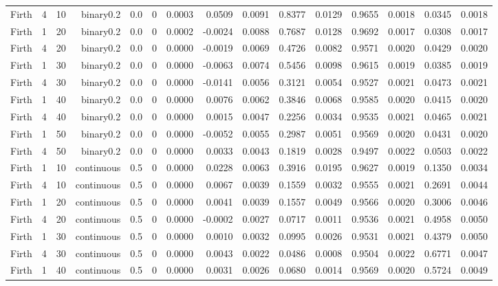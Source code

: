 \begin{longtable}{rrrrrrrrrrrrrrr}
  Firth & 4 & 10 & binary0.2 & 0.0 & 0 & 0.0003 & 0.0509 & 0.0091 & 0.8377 & 0.0129 & 0.9655 & 0.0018 & 0.0345 & 0.0018 \\ 
  Firth & 1 & 20 & binary0.2 & 0.0 & 0 & 0.0002 & -0.0024 & 0.0088 & 0.7687 & 0.0128 & 0.9692 & 0.0017 & 0.0308 & 0.0017 \\ 
  Firth & 4 & 20 & binary0.2 & 0.0 & 0 & 0.0000 & -0.0019 & 0.0069 & 0.4726 & 0.0082 & 0.9571 & 0.0020 & 0.0429 & 0.0020 \\ 
  Firth & 1 & 30 & binary0.2 & 0.0 & 0 & 0.0000 & -0.0063 & 0.0074 & 0.5456 & 0.0098 & 0.9615 & 0.0019 & 0.0385 & 0.0019 \\ 
  Firth & 4 & 30 & binary0.2 & 0.0 & 0 & 0.0000 & -0.0141 & 0.0056 & 0.3121 & 0.0054 & 0.9527 & 0.0021 & 0.0473 & 0.0021 \\ 
  Firth & 1 & 40 & binary0.2 & 0.0 & 0 & 0.0000 & 0.0076 & 0.0062 & 0.3846 & 0.0068 & 0.9585 & 0.0020 & 0.0415 & 0.0020 \\ 
  Firth & 4 & 40 & binary0.2 & 0.0 & 0 & 0.0000 & 0.0015 & 0.0047 & 0.2256 & 0.0034 & 0.9535 & 0.0021 & 0.0465 & 0.0021 \\ 
  Firth & 1 & 50 & binary0.2 & 0.0 & 0 & 0.0000 & -0.0052 & 0.0055 & 0.2987 & 0.0051 & 0.9569 & 0.0020 & 0.0431 & 0.0020 \\ 
  Firth & 4 & 50 & binary0.2 & 0.0 & 0 & 0.0000 & 0.0033 & 0.0043 & 0.1819 & 0.0028 & 0.9497 & 0.0022 & 0.0503 & 0.0022 \\ 
  Firth & 1 & 10 & continuous & 0.5 & 0 & 0.0000 & 0.0228 & 0.0063 & 0.3916 & 0.0195 & 0.9627 & 0.0019 & 0.1350 & 0.0034 \\ 
  Firth & 4 & 10 & continuous & 0.5 & 0 & 0.0000 & 0.0067 & 0.0039 & 0.1559 & 0.0032 & 0.9555 & 0.0021 & 0.2691 & 0.0044 \\ 
  Firth & 1 & 20 & continuous & 0.5 & 0 & 0.0000 & 0.0041 & 0.0039 & 0.1557 & 0.0049 & 0.9566 & 0.0020 & 0.3006 & 0.0046 \\ 
  Firth & 4 & 20 & continuous & 0.5 & 0 & 0.0000 & -0.0002 & 0.0027 & 0.0717 & 0.0011 & 0.9536 & 0.0021 & 0.4958 & 0.0050 \\ 
  Firth & 1 & 30 & continuous & 0.5 & 0 & 0.0000 & 0.0010 & 0.0032 & 0.0995 & 0.0026 & 0.9531 & 0.0021 & 0.4379 & 0.0050 \\ 
  Firth & 4 & 30 & continuous & 0.5 & 0 & 0.0000 & 0.0043 & 0.0022 & 0.0486 & 0.0008 & 0.9504 & 0.0022 & 0.6771 & 0.0047 \\ 
  Firth & 1 & 40 & continuous & 0.5 & 0 & 0.0000 & 0.0031 & 0.0026 & 0.0680 & 0.0014 & 0.9569 & 0.0020 & 0.5724 & 0.0049 \\ 

\end{longtable}

